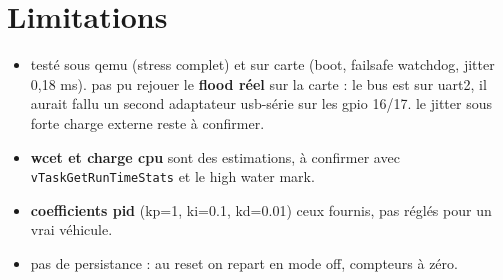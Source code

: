 \documentclass[a4paper,11pt]{article}
\begin{document}
\section{Limitations}

\begin{itemize}
    \item testé sous qemu (stress complet) et sur carte (boot, failsafe watchdog,
    jitter 0,18 ms). pas pu rejouer le \textbf{flood réel} sur la carte : le bus
    est sur uart2, il aurait fallu un second adaptateur usb-série sur les gpio
    16/17. le jitter sous forte charge externe reste à confirmer.
    \item \textbf{wcet et charge cpu} sont des estimations, à confirmer avec
    \texttt{vTaskGetRunTimeStats} et le high water mark.
    \item \textbf{coefficients pid} (kp=1, ki=0.1, kd=0.01) ceux fournis, pas
    réglés pour un vrai véhicule.
    \item pas de persistance : au reset on repart en mode off, compteurs à zéro.
\end{itemize}
\end{document}
